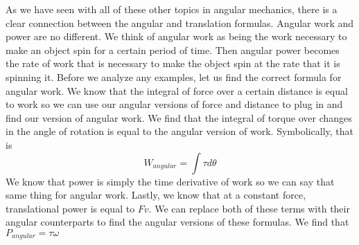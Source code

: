 As we have seen with all of these other topics in angular mechanics, there is a clear connection between the angular and translation formulas. Angular work and power are no different. We think of angular work as being the work necessary to make an object spin for a certain period of time. Then angular power becomes the rate of work that is necessary to make the object spin at the rate that it is spinning it. Before we analyze any examples, let us find the correct formula for angular work. We know that the integral of force over a certain distance is equal to work so we can use our angular versions of force and distance to plug in and find our version of angular work. We find that the integral of torque over changes in the angle of rotation is equal to the angular version of work. Symbolically, that is \begin{equation}W_{angular} = \int \tau d\theta\end{equation}
We know that power is simply the time derivative of work so we can say that same thing for angular work. Lastly, we know that at a constant force, translational power is equal to $Fv$. We can replace both of these terms with their angular counterparts to find the angular versions of these formulas. We find that $P_{angular} = \tau \omega$

